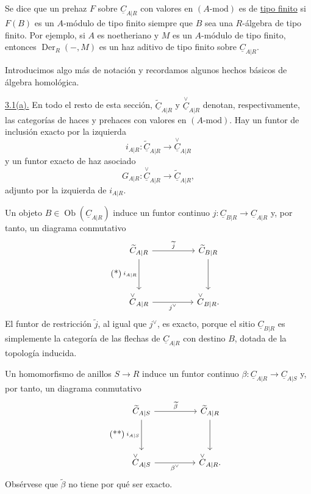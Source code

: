 Se dice que un prehaz $F$ sobre $\underline C_{A|R}$ con valores en
$(A\text{-mod})$ es de \underline{tipo finito} si $F(B)$ es un
$A$-módulo de tipo finito siempre que $B$ sea una $R$-álgebra de tipo
finito. Por ejemplo, si $A$ es noetheriano y $M$ es un $A$-módulo de tipo
finito, entonces $\operatorname{Der}_R(-,M)$ es un haz aditivo de tipo
finito sobre $\underline C_{A|R}$.

Introducimos algo más de notación y recordamos algunos hechos básicos de
álgebra homológica.

\underline{3.1(a).} En todo el resto de esta sección,
$\widetilde{\underline C}_{A|R}$ y
$\overset{\vee}{\underline C}_{A|R}$ denotan, respectivamente, las
categorías de haces y prehaces con valores en $(A\text{-mod})$. Hay un
funtor de inclusión exacto por la izquierda
\[
 i_{A|R}:\widetilde{\underline C}_{A|R}
 \longrightarrow\overset{\vee}{\underline C}_{A|R}
\]
y un funtor exacto de haz asociado
\[
 G_{A|R}:\overset{\vee}{\underline C}_{A|R}
 \longrightarrow\widetilde{\underline C}_{A|R},
\]
adjunto por la izquierda de $i_{A|R}$.


Un objeto $B\in\operatorname{Ob}(\underline C_{A|R})$ induce un
funtor continuo
$j:\underline C_{B|R}\longrightarrow\underline C_{A|R}$ y, por tanto,
un diagrama conmutativo
\begin{equation}\tag{*}
\begin{tikzcd}[column sep=huge,row sep=huge]
 \widetilde{\underline C}_{A|R}
   \arrow[r,"\widetilde j"] \arrow[d,"i_{A|R}"']
 & \widetilde{\underline C}_{B|R} \arrow[d] \\
 \overset{\vee}{\underline C}_{A|R}
   \arrow[r,"j^{\vee}"']
 & \overset{\vee}{\underline C}_{B|R}.
\end{tikzcd}
\end{equation}
El funtor de restricción $\widetilde j$, al igual que $j^{\vee}$, es
exacto, porque el sitio $\underline C_{B|R}$ es simplemente la categoría
de las flechas de $\underline C_{A|R}$ con destino $B$, dotada de la
topología inducida.

Un homomorfismo de anillos $S\longrightarrow R$ induce un funtor continuo
$\beta:\underline C_{A|R}\longrightarrow\underline C_{A|S}$ y, por
tanto, un diagrama conmutativo
\begin{equation}\tag{**}
\begin{tikzcd}[column sep=huge,row sep=huge]
 \widetilde{\underline C}_{A|S}
   \arrow[r,"\widetilde\beta"] \arrow[d,"i_{A|S}"']
 & \widetilde{\underline C}_{A|R} \arrow[d] \\
 \overset{\vee}{\underline C}_{A|S}
   \arrow[r,"\beta^{\vee}"']
 & \overset{\vee}{\underline C}_{A|R}.
\end{tikzcd}
\end{equation}
Obsérvese que $\widetilde\beta$ no tiene por qué ser exacto.

